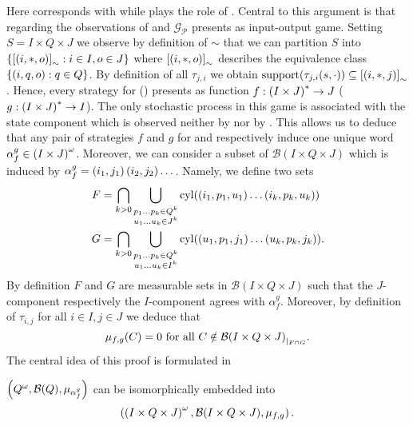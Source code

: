 Here \eve{} corresponds with \outputp{} while \adam{} plays the role of
. Central to this argument is that regarding the observations of
\eve{} and \adam{} $\mathcal{G}_{\mathcal{P}}$ presents as input-output game.
Setting $S = I\times Q\times J$ we observe by definition of $\sim$ that we can
partition $S$ into $\left\{\left[\left(i, *, o\right)\right]_{\sim}:i\in I, o\in J\right\}$
where $\left[\left(i, *, o\right)\right]_{\sim}$ describes the equivalence class
$\left\{\left(i, q, o\right):q\in Q\right\}$. By definition of all $\tau_{j,i}$ we obtain
$\operatorname{support}(\tau_{j,i}(s, \cdot))\subseteq\left[\left(i,*,j\right)\right]_{\sim}$. Hence,
every strategy for \eve{} (\adam{}) presents as function
$f:\left(I\times J\right)^{*}\rightarrow J$ 
($g:\left(I\times J\right)^{*}\rightarrow I$). The only stochastic process in this
game is associated with the state component which is observed neither by 
\eve{} nor by \adam{}. This allows us to deduce that any pair of 
strategies $f$ and $g$ for \eve{} and \adam{} respectively induce one unique
word $\alpha_{f}^{g}\in\left(I\times J\right)^{\omega}$. Moreover, we can consider
a subset of $\mathcal{B}(I\times Q\times J)$ which is induced by 
$\alpha_{f}^{g} = \left(i_{1}, j_{1}\right)\left(i_{2}, j_{2}\right)\dots$. Namely, we 
define two sets
\begin{align*}
  F &= \bigcap_{k>0}\bigcup_{
    \substack{
      p_{1}\dots p_{k}\in Q^{k}\\
      u_{1}\dots u_{k}\in J^{k}
    }
  }\operatorname{cyl}(\left(i_{1}, p_{1}, u_{1}\right)\dots\left(i_{k}, p_{k}, u_{k}\right))\\
  G &= \bigcap_{k>0}\bigcup_{
    \substack{
      p_{1}\dots p_{k}\in Q^{k}\\
      u_{1}\dots u_{k}\in I^{k}
    }
  }\operatorname{cyl}(\left(u_{1}, p_{1}, j_{1}\right)\dots\left(u_{k}, p_{k}, j_{k}\right)).
\end{align*}
By definition $F$ and $G$ are measurable sets in
$\mathcal{B}(I\times Q\times J)$ such that the $J$-component respectively the
$I$-component agrees with $\alpha_{f}^{g}$. Moreover, by definition of
$\tau_{i, j}$ for all $i\in I, j\in J$ we deduce that
\begin{equation}
  \mu_{f,g}(C) = 0\text{ for all }
  C\notin{\mathcal{B}(I\times Q\times J)}_{|_{F\cap G}}.
  \label{eq:weightinFG}
\end{equation}
The central idea of this proof is formulated in
\begin{lemma}
  $\left(Q^{\omega}, \mathcal{B}(Q), \mu_{\alpha_{f}^{g}}\right)$ can be
  isomorphically embedded into
  \begin{equation*}
    \left(\left(I\times Q\times J\right)^{\omega}, \mathcal{B}(I\times Q\times J),
    \mu_{f,g}\right).
  \end{equation*}
  \label{lem:fginpba}
\end{lemma}
